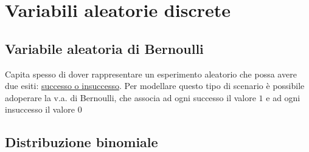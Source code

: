 \section{Variabili aleatorie discrete}
\subsection{Variabile aleatoria di Bernoulli}
Capita spesso di dover rappresentare un esperimento aleatorio che possa avere due esiti: \underline{successo o insuccesso}. Per modellare questo tipo di scenario è possibile adoperare la v.a. di Bernoulli, che associa ad ogni successo il valore $ 1 $ e ad ogni insuccesso il valore $ 0 $
\subsection{Distribuzione binomiale}
\label{vabinomiale} 

